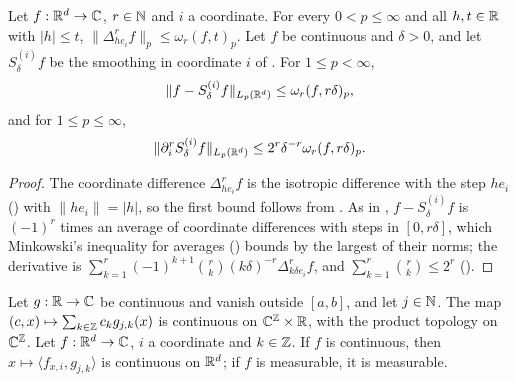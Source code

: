 \begin{lemma}
\label{lem:rd-coordinate-smoothing}
\leanok
{}
Let $f : \mathbb{R}^d \to \mathbb{C}$, $r \in \mathbb{N}$ and $i$ a coordinate. For every $0 < p \leq \infty$ and all
$h, t \in \mathbb{R}$ with $|h| \leq t$, $\|\Delta^r_{h e_i} f\|_p \leq \omega_r(f, t)_p$. Let $f$ be
continuous and $\delta > 0$, and let $S^{(i)}_\delta f$ be the smoothing in coordinate $i$ of
. For $1 \leq p < \infty$,
\[
  \|f - S^{(i)}_\delta f\|_{L_p(\mathbb{R}^d)} \leq \omega_r(f, r\delta)_p ,
\]
and for $1 \leq p \leq \infty$,
\[
  \|\partial_i^r S^{(i)}_\delta f\|_{L_p(\mathbb{R}^d)} \leq 2^r \delta^{-r} \omega_r(f, r\delta)_p .
\]
\end{lemma}

\begin{proof}
\leanok
{}
The coordinate difference $\Delta^r_{h e_i} f$ is the isotropic difference with the step
$h e_i$ () with $\|h e_i\| = |h|$, so the first bound follows from
. As in
, $f - S^{(i)}_\delta f$ is $(-1)^r$ times an average of coordinate
differences with steps in $[0, r\delta]$, which Minkowski's inequality for averages
() bounds by the largest of their norms; the derivative is
$\sum_{k=1}^r (-1)^{k+1} \binom{r}{k} (k\delta)^{-r} \Delta^r_{k\delta e_i} f$, and
$\sum_{k=1}^r \binom{r}{k} \leq 2^r$ ().
\end{proof}

\begin{lemma}
\label{lem:daub-expand-joint}
\leanok
{}
Let $g : \mathbb{R} \to \mathbb{C}$ be continuous and vanish outside $[a, b]$, and let $j \in \mathbb{N}$. The map
$(c, x) \mapsto \sum_{k \in \mathbb{Z}} c_k g_{j,k}(x)$ is continuous on $\mathbb{C}^{\mathbb{Z}} \times \mathbb{R}$, with the
product topology on $\mathbb{C}^{\mathbb{Z}}$. Let $f : \mathbb{R}^d \to \mathbb{C}$, $i$ a coordinate and $k \in \mathbb{Z}$. If $f$ is
continuous, then $x \mapsto \langle f_{x,i}, g_{j,k} \rangle$ is continuous on $\mathbb{R}^d$; if $f$ is
measurable, it is measurable.
\end{lemma}

